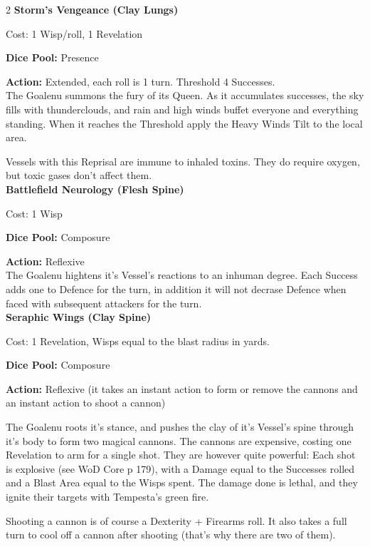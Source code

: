\begin{multicols}{2}
\noindent\textbf{Storm’s Vengeance (Clay Lungs)}

\noindent Cost: 1 Wisp/roll, 1 Revelation

\noindent\textbf{Dice Pool:} Presence

\noindent\textbf{Action:} Extended, each roll is 1 turn. Threshold 4 Successes.\\

\noindent The Goalenu summons the fury of its Queen. As it accumulates successes, the sky fills with thunderclouds, and rain and high winds buffet everyone and everything standing. When it reaches the Threshold apply the Heavy Winds Tilt to the local area.

Vessels with this Reprisal are immune to inhaled toxins.  They do require oxygen, but toxic gases don't affect them.\\

\noindent\textbf{Battlefield Neurology (Flesh Spine)}

\noindent Cost: 1 Wisp

\noindent\textbf{Dice Pool:} Composure

\noindent\textbf{Action:} Reflexive\\

The Goalenu hightens it's Vessel's reactions to an inhuman degree. Each Success adds one to Defence for the turn, in addition it will not decrase Defence when faced with subsequent attackers for the turn. \\

\noindent\textbf{Seraphic Wings (Clay Spine)}

\noindent Cost: 1 Revelation, Wisps equal to the blast radius in yards.

\noindent\textbf{Dice Pool:} Composure

\noindent\textbf{Action:} Reflexive (it takes an instant action to form or remove the cannons and an instant action to shoot a cannon)

The Goalenu roots it's stance, and pushes the clay of it's Vessel's spine through it's body to form two magical cannons. The cannons are expensive, costing one Revelation to arm for a single shot. They are however quite powerful: Each shot is explosive (see WoD Core p 179), with a Damage equal to the Successes rolled and a Blast Area equal to the Wisps spent. The damage done is lethal, and they ignite their targets with Tempesta's green fire. 

Shooting a cannon is of course a Dexterity + Firearms roll. It also takes a full turn to cool off a cannon after shooting (that's why there are two of them). 


\end{multicols}
